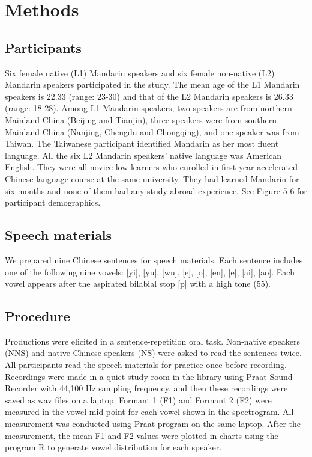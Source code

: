 \documentclass[man, fleqn, noextraspace]{apa6}
\begin{document}
\section{Methods}\label{methods}

\subsection{Participants}\label{participants}

Six female native (L1) Mandarin speakers and six female non-native (L2)
Mandarin speakers participated in the study. The mean age of the L1
Mandarin speakers is 22.33 (range: 23-30) and that of the L2 Mandarin
speakers is 26.33 (range: 18-28). Among L1 Mandarin speakers, two
speakers are from northern Mainland China (Beijing and Tianjin), three
speakers were from southern Mainland China (Nanjing, Chengdu and
Chongqing), and one speaker was from Taiwan. The Taiwanese participant
identified Mandarin as her most fluent language. All the six L2 Mandarin
speakers' native language was American English. They were all novice-low
learners who enrolled in first-year accelerated Chinese language course
at the same university. They had learned Mandarin for six months and
none of them had any study-abroad experience. See Figure 5-6 for
participant demographics.

\subsection{Speech materials}\label{speech-materials}

We prepared nine Chinese sentences for speech materials. Each sentence
includes one of the following nine vowels: {[}yi{]}, {[}yu{]}, {[}wu{]},
{[}e{]}, {[}o{]}, {[}en{]}, {[}e{]}, {[}ai{]}, {[}ao{]}. Each vowel
appears after the aspirated bilabial stop {[}p{]} with a high tone (55).

\subsection{Procedure}\label{procedure}

Productions were elicited in a sentence-repetition oral task. Non-native
speakers (NNS) and native Chinese speakers (NS) were asked to read the
sentences twice. All participants read the speech materials for practice
once before recording. Recordings were made in a quiet study room in the
library using Praat Sound Recorder with 44,100 Hz sampling frequency,
and then these recordings were saved as wav files on a laptop. Formant 1
(F1) and Formant 2 (F2) were measured in the vowel mid-point for each
vowel shown in the spectrogram. All measurement was conducted using
Praat program on the same laptop. After the measurement, the mean F1 and
F2 values were plotted in charts using the program R to generate vowel
distribution for each speaker.
\end{document}

